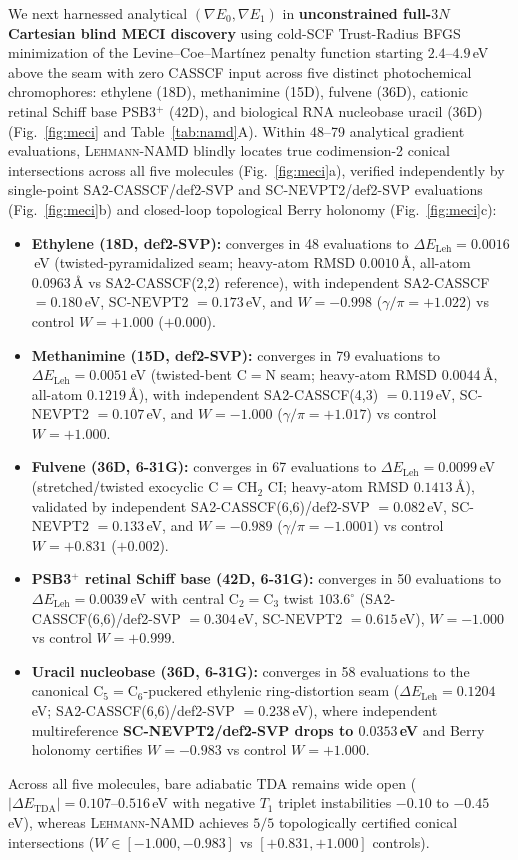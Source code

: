 \documentclass[10pt,twocolumn]{article}
\theoremstyle{natthm}
\newcommand{\leh}{\textsc{Lehmann-NAMD}}
\begin{document}
We next harnessed analytical $(\nabla E_0, \nabla E_1)$ in \textbf{unconstrained full-$3N$ Cartesian blind MECI discovery} using cold-SCF Trust-Radius BFGS minimization of the Levine--Coe--Mart\'inez penalty function\cite{levine2008meci} starting $2.4$--$4.9$\,eV above the seam with zero CASSCF input across five distinct photochemical chromophores: ethylene (18D), methanimine (15D), fulvene (36D), cationic retinal Schiff base PSB3$^+$ (42D), and biological RNA nucleobase uracil (36D) (Fig.~\ref{fig:meci} and Table~\ref{tab:namd}A).
Within 48--79 analytical gradient evaluations, \leh{} blindly locates true codimension-2 conical intersections across all five molecules (Fig.~\ref{fig:meci}a), verified independently by single-point SA2-CASSCF/def2-SVP and SC-NEVPT2/def2-SVP evaluations (Fig.~\ref{fig:meci}b) and closed-loop topological Berry holonomy (Fig.~\ref{fig:meci}c):
\begin{itemize}
  \setlength{\itemsep}{1pt}
  \item \textbf{Ethylene (18D, def2-SVP):} converges in 48 evaluations to $\Delta E_{\mathrm{Leh}}=0.0016$\,eV (twisted-pyramidalized seam; heavy-atom RMSD $\mathbf{0.0010}$\,\AA{}, all-atom $0.0963$\,\AA{} vs SA2-CASSCF(2,2) reference), with independent SA2-CASSCF $=0.180$\,eV, SC-NEVPT2 $=0.173$\,eV, and $W=-0.998$ ($\gamma/\pi=+1.022$) vs control $W=+1.000$ ($+0.000$).
  \item \textbf{Methanimine (15D, def2-SVP):} converges in 79 evaluations to $\Delta E_{\mathrm{Leh}}=0.0051$\,eV (twisted-bent $\mathrm{C}=\mathrm{N}$ seam; heavy-atom RMSD $\mathbf{0.0044}$\,\AA{}, all-atom $0.1219$\,\AA{}), with independent SA2-CASSCF(4,3) $=0.119$\,eV, SC-NEVPT2 $=0.107$\,eV, and $W=-1.000$ ($\gamma/\pi=+1.017$) vs control $W=+1.000$.
  \item \textbf{Fulvene (36D, 6-31G):} converges in 67 evaluations to $\Delta E_{\mathrm{Leh}}=0.0099$\,eV (stretched/twisted exocyclic $\mathrm{C}=\mathrm{CH}_2$ CI; heavy-atom RMSD $0.1413$\,\AA{}), validated by independent SA2-CASSCF(6,6)/def2-SVP $=0.082$\,eV, SC-NEVPT2 $=0.133$\,eV, and $W=-0.989$ ($\gamma/\pi=-1.0001$) vs control $W=+0.831$ ($+0.002$).
  \item \textbf{PSB3$^+$ retinal Schiff base (42D, 6-31G):} converges in 50 evaluations to $\Delta E_{\mathrm{Leh}}=0.0039$\,eV with central $\mathrm{C}_2=\mathrm{C}_3$ twist $103.6^\circ$ (SA2-CASSCF(6,6)/def2-SVP $=0.304$\,eV, SC-NEVPT2 $=0.615$\,eV), $W=-1.000$ vs control $W=+0.999$.
  \item \textbf{Uracil nucleobase (36D, 6-31G):} converges in 58 evaluations to the canonical $\mathrm{C}_5=\mathrm{C}_6$-puckered ethylenic ring-distortion seam\cite{matsika2004uracil} ($\Delta E_{\mathrm{Leh}}=0.1204$\,eV; SA2-CASSCF(6,6)/def2-SVP $=0.238$\,eV), where independent multireference \textbf{SC-NEVPT2/def2-SVP drops to $\mathbf{0.0353}$\,eV} and Berry holonomy certifies $W=-0.983$ vs control $W=+1.000$.
\end{itemize}
Across all five molecules, bare adiabatic TDA remains wide open ($|\Delta E_{\mathrm{TDA}}|=0.107$--$0.516$\,eV with negative $T_1$ triplet instabilities $-0.10$ to $-0.45$\,eV), whereas \leh{} achieves $5/5$ topologically certified conical intersections ($W\in[-1.000,-0.983]$ vs $[+0.831,+1.000]$ controls).
\end{document}
